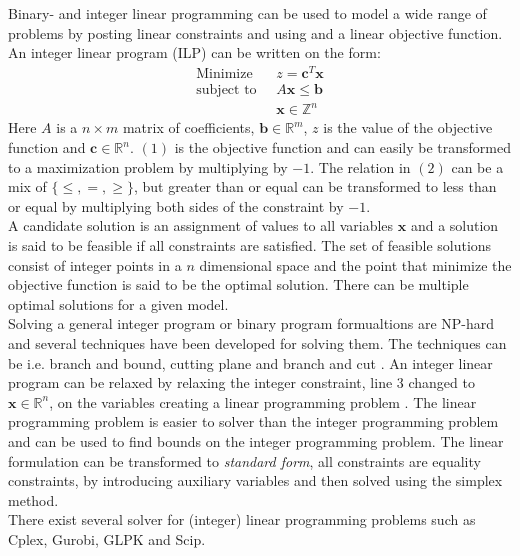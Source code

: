 Binary- and integer linear programming can be used to model a wide range of problems by posting linear constraints and 
using and a linear objective function. An integer linear program (ILP) can be written on the form: 
\begin{align}
 \text{Minimize }\; &z =  \mathbf{c}^T\mathbf{x} \\ 
 \text{subject to } \; & A\mathbf{x} \leq \mathbf{b} \\ 
 & \mathbf{x} \in \mathbb{Z}^n
\end{align} \noindent
Here $A$ is a $n \times m$ matrix of coefficients, $\mathbf{b} \in \mathbb{R}^m$, $z$ is the value of the objective 
function and $\mathbf{c} \in \mathbb{R}^n$. $(1)$ is the objective function and can easily be transformed to a 
maximization problem by multiplying by $-1$. The relation in $(2)$ can be a mix of $\{\leq,=,\geq\}$, but greater 
than or equal can be transformed to less than or equal by multiplying both sides of the constraint by $-1$.  \\ 
A candidate solution is an assignment of values to all variables $\mathbf{x}$ and a solution is said to be feasible if 
all constraints are satisfied. The set of feasible solutions consist of integer points in a $n$ dimensional space and 
the point that minimize the objective function is said to be the optimal solution. There can be multiple optimal 
solutions for a given model. \\
Solving a general integer program or binary program formualtions are NP-hard \cite[p.30]{ilpbog} and several techniques 
have been developed for solving them. The techniques can be i.e. branch and bound, cutting plane and branch and cut 
\cite[p.31]{ilpbog}. An integer linear program can be relaxed by relaxing the integer constraint, line 3 changed to 
$\mathbf{x} \in \mathbb{R}^n$, on the variables creating a linear programming problem \cite[p. 30]{ilpbog}. The linear 
programming problem is easier to solver than the integer programming problem and can be used to find bounds on the 
integer programming problem. The linear formulation can be transformed to \emph{standard form}, all constraints are 
equality constraints, by introducing auxiliary variables and then solved using the simplex method. \\ 
There exist several solver for (integer) linear programming problems such as Cplex, Gurobi, GLPK and Scip. 